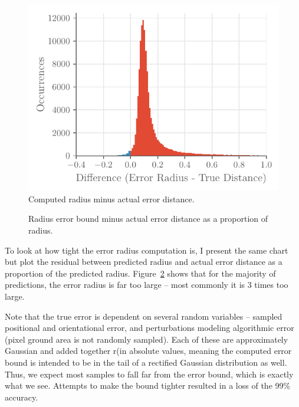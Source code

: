 \documentclass[a4paper,12pt,twoside,openright]{report}
\begin{document}
\begin{figure}[htb]
    \begin{center}
        \includegraphics{figures/camera/diff_radius_true_error.pdf}
    \end{center}
    \caption[Bound Minus True Distance]{Computed radius minus actual error distance.}
    \label{fig:camera:diff bound error}
\end{figure}

\begin{figure}[htb]
    \begin{center}
        
    \end{center}
    \caption[Bound Minus True Distance as a Proportion]{Radius error bound minus actual error distance as a proportion of radius.}
    \label{fig:camera:proportional diff}
\end{figure}

To look at how tight the error radius computation is, I present the same chart
but plot the residual between predicted radius and actual error distance as a 
proportion of the predicted radius. Figure~\ref{fig:camera:proportional diff} shows that for the majority
of predictions, the error radius is far too large -- most commonly it is 3 times 
too large. 

Note that the true error is dependent on several random variables -- sampled positional and orientational
error, and perturbations modeling algorithmic error (pixel ground area is not randomly sampled). Each
of these are approximately Gaussian and added together r(in absolute values, meaning the computed error bound is intended to be in the tail
of a rectified Gaussian distribution as well. Thus, we expect most samples to
fall far from the error bound, which is exactly what we see.
Attempts to make the bound tighter resulted in a loss of the 99\% accuracy.
\end{document}
